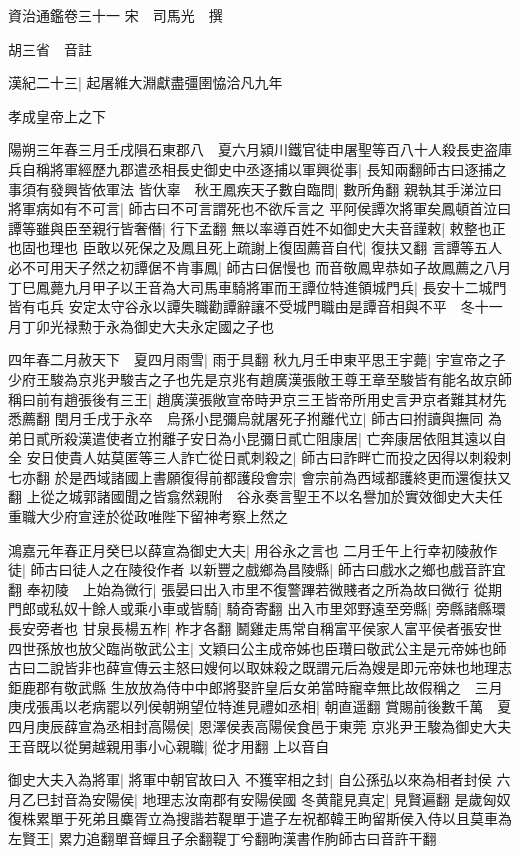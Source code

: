 資治通鑑卷三十一
宋　司馬光　撰

胡三省　音註

漢紀二十三|{
	起屠維大淵獻盡彊圉恊洽凡九年}


孝成皇帝上之下

陽朔三年春三月壬戌隕石東郡八　夏六月潁川鐵官徒申屠聖等百八十人殺長吏盗庫兵自稱將軍經歷九郡遣丞相長史御史中丞逐捕以軍興從事|{
	長知兩翻師古曰逐捕之事須有發興皆依軍法}
皆㐲辜　秋王鳳疾天子數自臨問|{
	數所角翻}
親執其手涕泣曰將軍病如有不可言|{
	師古曰不可言謂死也不欲斥言之}
平阿侯譚次將軍矣鳳頓首泣曰譚等雖與臣至親行皆奢僭|{
	行下孟翻}
無以率導百姓不如御史大夫音謹敕|{
	敕整也正也固也理也}
臣敢以死保之及鳳且死上疏謝上復固薦音自代|{
	復扶又翻}
言譚等五人必不可用天子然之初譚倨不肯事鳳|{
	師古曰倨慢也}
而音敬鳳卑恭如子故鳳薦之八月丁巳鳳薨九月甲子以王音為大司馬車騎將軍而王譚位特進領城門兵|{
	長安十二城門皆有屯兵}
安定太守谷永以譚失職勸譚辭讓不受城門職由是譚音相與不平　冬十一月丁卯光禄勲于永為御史大夫永定國之子也

四年春二月赦天下　夏四月雨雪|{
	雨于具翻}
秋九月壬申東平思王宇薨|{
	宇宣帝之子}
少府王駿為京兆尹駿吉之子也先是京兆有趙廣漢張敞王尊王章至駿皆有能名故京師稱曰前有趙張後有三王|{
	趙廣漢張敞宣帝時尹京三王皆帝所用史言尹京者難其材先悉薦翻}
閏月壬戌于永卒　烏孫小昆彌烏就屠死子拊離代立|{
	師古曰拊讀與撫同}
為弟日貳所殺漢遣使者立拊離子安日為小昆彌日貳亡阻康居|{
	亡奔康居依阻其遠以自全}
安日使貴人姑莫匿等三人詐亡從日貳刺殺之|{
	師古曰詐畔亡而投之因得以刺殺刺七亦翻}
於是西域諸國上書願復得前都護段會宗|{
	會宗前為西域都護終更而還復扶又翻}
上從之城郭諸國聞之皆翕然親附　谷永奏言聖王不以名譽加於實效御史大夫任重職大少府宣逹於從政唯陛下留神考察上然之

鴻嘉元年春正月癸巳以薛宣為御史大夫|{
	用谷永之言也}
二月壬午上行幸初陵赦作徒|{
	師古曰徒人之在陵役作者}
以新豐之戲鄉為昌陵縣|{
	師古曰戲水之鄉也戲音許宜翻}
奉初陵　上始為微行|{
	張晏曰出入市里不復警蹕若微賤者之所為故曰微行}
從期門郎或私奴十餘人或乘小車或皆騎|{
	騎奇寄翻}
出入市里郊野遠至旁縣|{
	旁縣諸縣環長安旁者也}
甘泉長楊五柞|{
	柞才各翻}
鬭雞走馬常自稱富平侯家人富平侯者張安世四世孫放也放父臨尚敬武公主|{
	文穎曰公主成帝姊也臣瓚曰敬武公主是元帝姊也師古曰二說皆非也薛宣傳云主怒曰嫂何以取妺殺之既謂元后為嫂是即元帝妹也地理志鉅鹿郡有敬武縣}
生放放為侍中中郎將娶許皇后女弟當時寵幸無比故假稱之　三月庚戌張禹以老病罷以列侯朝朔望位特進見禮如丞相|{
	朝直遥翻}
賞賜前後數千萬　夏四月庚辰薛宣為丞相封高陽侯|{
	恩澤侯表高陽侯食邑于東莞}
京兆尹王駿為御史大夫王音既以從舅越親用事小心親職|{
	從才用翻}
上以音自

御史大夫入為將軍|{
	將軍中朝官故曰入}
不獲宰相之封|{
	自公孫弘以來為相者封侯}
六月乙巳封音為安陽侯|{
	地理志汝南郡有安陽侯國}
冬黄龍見真定|{
	見賢遍翻}
是歲匈奴復株累單于死弟且麋胥立為搜諧若鞮單于遣子左祝都韓王昫留斯侯入侍以且莫車為左賢王|{
	累力追翻單音蟬且子余翻鞮丁兮翻昫漢書作胊師古曰音許干翻}


